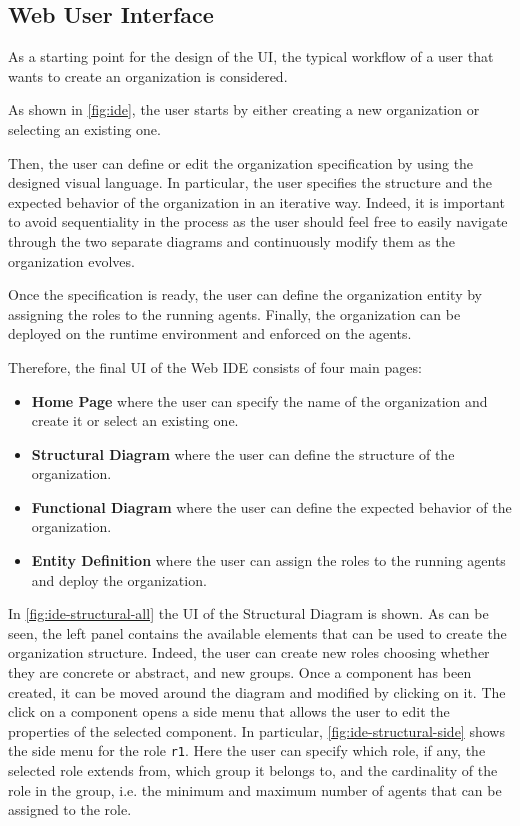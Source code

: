 \subsection{Web User Interface}
As a starting point for the design of the UI, the typical workflow of a user that wants to create an organization is considered.

As shown in \cref{fig:ide}, the user starts by either creating a new organization or selecting an existing one.

Then, the user can define or edit the organization specification by using the designed visual language.
In particular, the user specifies the structure and the expected behavior of the organization in an iterative way.
Indeed, it is important to avoid sequentiality in the process as the user should feel free to easily navigate through the two separate diagrams and continuously modify them as the organization evolves.

Once the specification is ready, the user can define the organization entity by assigning the roles to the running agents. Finally, the organization can be deployed on the runtime environment and enforced on the agents.

Therefore, the final UI of the Web IDE consists of four main pages:
\begin{itemize}
    \item \textbf{Home Page} where the user can specify the name of the organization and create it or select an existing one.
    \item \textbf{Structural Diagram} where the user can define the structure of the organization.
    \item \textbf{Functional Diagram} where the user can define the expected behavior of the organization.
    \item \textbf{Entity Definition} where the user can assign the roles to the running agents and deploy the organization.
\end{itemize}

In \cref{fig:ide-structural-all} the UI of the Structural Diagram is shown.
As can be seen, the left panel contains the available elements that can be used to create the organization structure.
Indeed, the user can create new roles choosing whether they are concrete or abstract, and new groups.
Once a component has been created, it can be moved around the diagram and modified by clicking on it.
The click on a component opens a side menu that allows the user to edit the properties of the selected component.
In particular, \cref{fig:ide-structural-side} shows the side menu for the role \texttt{r1}.
Here the user can specify which role, if any, the selected role extends from, which group it belongs to, and the cardinality of the role in the group, i.e. the minimum and maximum number of agents that can be assigned to the role.

